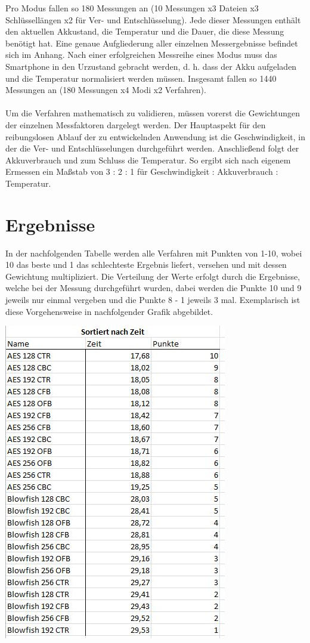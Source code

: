 \documentclass[10pt, a4paper,headsepline,pointednumbers]{scrreprt}
\begin{document}
Pro Modus fallen so 180 Messungen an (10 Messungen x3 Dateien x3 Schlüssellängen x2 für Ver- und Entschlüsselung). Jede dieser Messungen enthält den aktuellen Akkustand, die Temperatur und die Dauer, die diese Messung benötigt hat. Eine genaue Aufgliederung aller einzelnen Messergebnisse befindet sich im Anhang. Nach einer erfolgreichen Messreihe eines Modus muss das Smartphone in den Urzustand gebracht werden, d. h. dass der Akku aufgeladen und die Temperatur normalisiert werden müssen. Insgesamt fallen so 1440 Messungen an (180 Messungen x4 Modi x2 Verfahren).\\ \\
Um die Verfahren mathematisch zu validieren, müssen vorerst die Gewichtungen der einzelnen Messfaktoren dargelegt werden. Der Hauptaspekt für den reibungslosen Ablauf der zu entwickelnden Anwendung ist die Geschwindigkeit, in der die Ver- und Entschlüsselungen durchgeführt werden. Anschließend folgt der Akkuverbrauch und zum Schluss die Temperatur. So ergibt sich nach eigenem Ermessen ein Maßstab von 3 : 2 : 1 für Geschwindigkeit : Akkuverbrauch : Temperatur. 


\section{Ergebnisse}
In der nachfolgenden Tabelle werden alle Verfahren mit Punkten von 1-10, wobei 10 das beste und 1 das schlechteste Ergebnis liefert, versehen und mit dessen Gewichtung multipliziert. Die Verteilung der Werte erfolgt durch die Ergebnisse, welche bei der Messung durchgeführt wurden, dabei werden die Punkte 10 und 9 jeweils nur einmal vergeben und die Punkte 8 - 1 jeweils 3 mal. Exemplarisch ist diese Vorgehensweise in nachfolgender Grafik abgebildet. 

\includegraphics[scale=0.9]{tabelle_zeitvergleich_punkte.JPG}
\hfill
\end{document}
